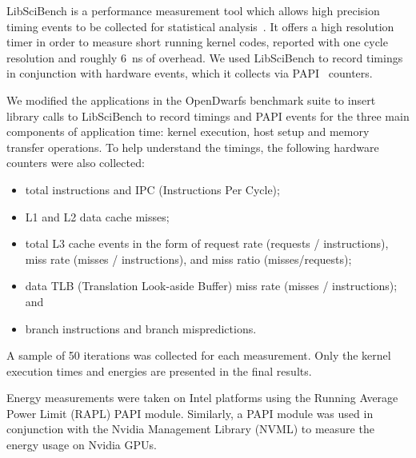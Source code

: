 \documentclass[../document.tex]{subfiles}
\begin{document}
\label{ssec:measurements}

LibSciBench is a performance measurement tool which allows high precision timing events to be collected for statistical analysis~\cite{hoefler2015scientific}.
It offers a high resolution timer in order to measure short running kernel codes, reported with one cycle resolution and roughly \SI{6}{\nano\second} of overhead.
We used LibSciBench to record timings in conjunction with hardware events, which it collects via PAPI~\cite{mucci1999papi} counters.

We modified the applications in the OpenDwarfs benchmark suite to insert library calls to LibSciBench to record timings and PAPI events for the three main components of application time: kernel execution, host setup and memory transfer operations.
To help understand the timings, the following hardware counters were also collected:
\begin{itemize}
	\item total instructions and IPC (Instructions Per Cycle);
	\item L1 and L2 data cache misses;
	\item total L3 cache events in the form of request rate (requests / instructions), miss rate (misses / instructions), and miss ratio (misses/requests);
	\item data TLB (Translation Look-aside Buffer) miss rate (misses / instructions); and
	\item branch instructions and branch mispredictions.
\end{itemize}

A sample of 50 iterations was collected for each measurement.
Only the kernel execution times and energies are presented in the final results.

Energy measurements were taken on Intel platforms using the Running Average Power Limit (RAPL) PAPI module.
Similarly, a PAPI module was used in conjunction with the Nvidia Management Library (NVML) to measure the energy usage on Nvidia GPUs.
\end{document}
